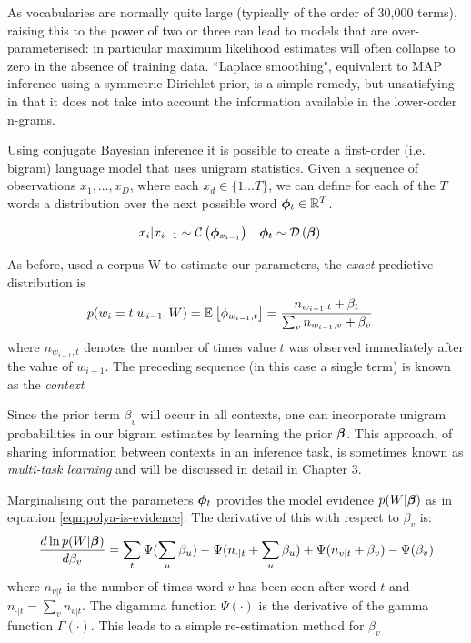 As vocabularies are normally quite large (typically of the order of 30,000 terms), raising this to the power of two or three can lead to models that are over-parameterised: in particular maximum likelihood estimates will often collapse to zero in the absence of training data. ``Laplace smoothing", equivalent to MAP inference using a symmetric Dirichlet prior, is a simple remedy, but unsatisfying in that it does not take into account the information available in the lower-order n-grams.

Using conjugate Bayesian inference it is possible to create a first-order (i.e. bigram) language model\cite{MacKay1995} that uses unigram statistics. Given a sequence of observations $x_1, \ldots, x_D$, where each $x_d \in \{1 \ldots T\}$, we can define for each of the $T$ words a distribution over the next possible word $\bm \phi_t \in { \mathbb{R}^{T} }$.

\begin{align}
x_i | x_{i - 1} 
& \sim \mathcal{C} \left( {\bm \phi_{x_{i-1}}} \right)
& \bm \phi_t 
& \sim \mathcal{D} \left( {\bm \beta} \right)
\end{align}

As before, used a corpus W to estimate our parameters, the \emph{exact} predictive distribution is
\begin{align}
p(w_i = t | w_{i-1}, W)
& = \mathbb{E}_{ {  } }\left[ \phi_{w_{i-1},t} \right]
  = \frac{n_{w_{i-1},t} + \beta_t}{\sum_v n_{w_{i-1},v} + \beta_v}
\end{align}
where $n_{w_{i-1},t}$ denotes the number of times value $t$ was observed immediately after the value of $w_{i-1}$. The preceding sequence (in this case a single term) is known as the \emph{context}

Since the prior term $\beta_v$ will occur in all contexts, one can incorporate unigram probabilities in our bigram estimates by learning the prior $\bm \beta$. This approach, of sharing information between contexts in an inference task, is sometimes known as \emph{multi-task learning} and will be discussed in detail in Chapter 3.

Marginalising out the parameters $\bm \phi_t$ provides the model evidence $p(W|\bm \beta)$ as in equation \eqref{eqn:polya-is-evidence}. The derivative of this with respect to $\beta_v$ is:
\begin{align}
\frac{d \ln p(W|\bm \beta)}{d\beta_v} =
\sum_t
     \Psi(\sum_u \beta_u) 
     - \Psi(n_{\cdot|t} + \sum_u \beta_u)
     + \Psi(n_{v|t} + \beta_v)
     - \Psi(\beta_v)
\end{align}
where $n_{v|t}$ is the number of times word $v$ has been seen after word $t$ and $n_{\cdot|t} = \sum_v n_{v|t}$. The digamma function $\Psi(\cdot)$ is the derivative of the gamma function $\Gamma(\cdot)$. This leads to a simple re-estimation method for $\beta_v$

